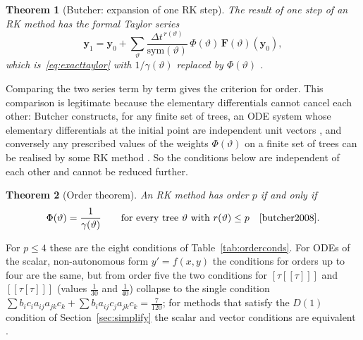 \documentclass[11pt,a4paper]{article}
\newcommand{\Dt}{\Delta t}
\newcommand{\bfy}{\mathbf{y}}
\newtheorem{theorem}{Theorem}[section]
\begin{document}
\begin{theorem}[Butcher: expansion of one RK step]\label{thm:rkexp}
The result of one step of an RK method has the formal Taylor series
\begin{equation}
\bfy_1=\bfy_0+\sum_{\vartheta}\frac{\Dt^{\,r(\vartheta)}}{\mathrm{sym}(\vartheta)}\,\Phi(\vartheta)\,\mathbf F(\vartheta)(\bfy_0),
\end{equation}
which is~\eqref{eq:exacttaylor} with $1/\gamma(\vartheta)$ replaced by $\Phi(\vartheta)$ \cite[Thm.~313B]{butcher2008}.
\end{theorem}

Comparing the two series term by term gives the criterion for order. This comparison is legitimate
because the elementary differentials cannot cancel each other: Butcher constructs, for any finite set of trees,
an ODE system whose elementary differentials at the initial point are independent unit vectors
\cite[Thm.~314A]{butcher2008}, and conversely any prescribed values of the weights $\Phi(\vartheta)$ on a finite set of trees
can be realised by some RK method \cite[Thm.~317A]{butcher2008}. So the conditions below are independent of each
other and cannot be reduced further.

\begin{theorem}[Order theorem]\label{thm:order}
An RK method has order $p$ if and only if
\begin{equation}
\Phi(\vartheta)=\frac1{\gamma(\vartheta)}\qquad\text{for every tree }\vartheta\text{ with }r(\vartheta)\le p
\quad\text{\cite[Thm.~315A]{butcher2008}.}
\end{equation}
\end{theorem}

For $p\le4$ these are the eight conditions of Table~\ref{tab:orderconds}. For ODEs of the scalar,
non-autonomous form $y'=f(x,y)$ the conditions for orders up to four are the same, but from order five the
two conditions for $[\tau[[\tau]]]$ and $[[\tau[\tau]]]$ (values $\tfrac1{30}$ and $\tfrac1{40}$) collapse to the
single condition $\sum b_ic_ia_{ij}a_{jk}c_k+\sum b_ia_{ij}c_ja_{jk}c_k=\tfrac7{120}$; for methods that satisfy the
$D(1)$ condition of Section~\ref{sec:simplify} the scalar and vector conditions are equivalent
\cite[Sect.~316]{butcher2008}.
\end{document}
